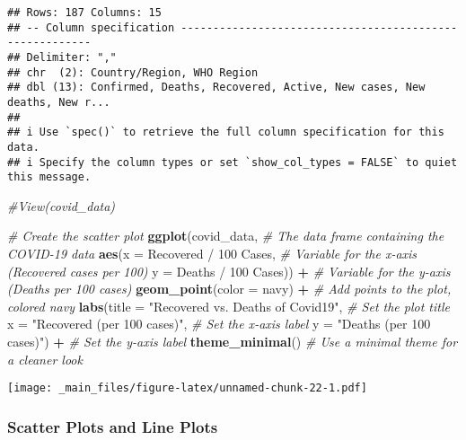 \documentclass[
]{book}
\newenvironment{Shaded}{\begin{snugshade}}{\end{snugshade}}
\newcommand{\AttributeTok}[1]{\textcolor[rgb]{0.13,0.29,0.53}{#1}}
\newcommand{\CommentTok}[1]{\textcolor[rgb]{0.56,0.35,0.01}{\textit{#1}}}
\newcommand{\FunctionTok}[1]{\textcolor[rgb]{0.13,0.29,0.53}{\textbf{#1}}}
\newcommand{\NormalTok}[1]{#1}
\newcommand{\SpecialCharTok}[1]{\textcolor[rgb]{0.81,0.36,0.00}{\textbf{#1}}}
\newcommand{\StringTok}[1]{\textcolor[rgb]{0.31,0.60,0.02}{#1}}
\begin{document}
\begin{verbatim}
## Rows: 187 Columns: 15
## -- Column specification --------------------------------------------------------
## Delimiter: ","
## chr  (2): Country/Region, WHO Region
## dbl (13): Confirmed, Deaths, Recovered, Active, New cases, New deaths, New r...
## 
## i Use `spec()` to retrieve the full column specification for this data.
## i Specify the column types or set `show_col_types = FALSE` to quiet this message.
\end{verbatim}

\begin{Shaded}
\begin{Highlighting}[]
\CommentTok{\#View(covid\_data)}

\CommentTok{\# Create the scatter plot}
\FunctionTok{ggplot}\NormalTok{(covid\_data, }\CommentTok{\# The data frame containing the COVID{-}19 data}
       \FunctionTok{aes}\NormalTok{(}\AttributeTok{x =} \StringTok{\textasciigrave{}}\AttributeTok{Recovered / 100 Cases}\StringTok{\textasciigrave{}}\NormalTok{, }\CommentTok{\# Variable for the x{-}axis (Recovered cases per 100)}
           \AttributeTok{y =} \StringTok{\textasciigrave{}}\AttributeTok{Deaths / 100 Cases}\StringTok{\textasciigrave{}}\NormalTok{)) }\SpecialCharTok{+} \CommentTok{\# Variable for the y{-}axis (Deaths per 100 cases)}
  \FunctionTok{geom\_point}\NormalTok{(}\AttributeTok{color =} \StringTok{\textquotesingle{}navy\textquotesingle{}}\NormalTok{) }\SpecialCharTok{+} \CommentTok{\# Add points to the plot, colored navy}
  \FunctionTok{labs}\NormalTok{(}\AttributeTok{title =} \StringTok{"Recovered vs. Deaths of Covid19"}\NormalTok{, }\CommentTok{\# Set the plot title}
       \AttributeTok{x =} \StringTok{"Recovered (per 100 cases)"}\NormalTok{, }\CommentTok{\# Set the x{-}axis label}
       \AttributeTok{y =} \StringTok{"Deaths (per 100 cases)"}\NormalTok{) }\SpecialCharTok{+} \CommentTok{\# Set the y{-}axis label}
  \FunctionTok{theme\_minimal}\NormalTok{() }\CommentTok{\# Use a minimal theme for a cleaner look}
\end{Highlighting}
\end{Shaded}

\texttt{[image: \_main\_files/figure-latex/unnamed-chunk-22-1.pdf]}

\subsubsection{Scatter Plots and Line Plots}\label{scatter-plots-and-line-plots}
\end{document}
